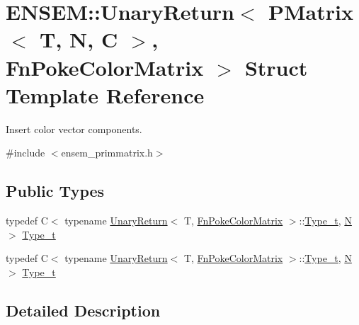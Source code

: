 \hypertarget{structENSEM_1_1UnaryReturn_3_01PMatrix_3_01T_00_01N_00_01C_01_4_00_01FnPokeColorMatrix_01_4}{}\section{E\+N\+S\+EM\+:\+:Unary\+Return$<$ P\+Matrix$<$ T, N, C $>$, Fn\+Poke\+Color\+Matrix $>$ Struct Template Reference}
\label{structENSEM_1_1UnaryReturn_3_01PMatrix_3_01T_00_01N_00_01C_01_4_00_01FnPokeColorMatrix_01_4}


Insert color vector components.  




{\ttfamily \#include $<$ensem\+\_\+primmatrix.\+h$>$}

\subsection*{Public Types}
\begin{DoxyCompactItemize}
\item 
typedef C$<$ typename \mbox{\hyperlink{structENSEM_1_1UnaryReturn}{Unary\+Return}}$<$ T, \mbox{\hyperlink{structENSEM_1_1FnPokeColorMatrix}{Fn\+Poke\+Color\+Matrix}} $>$\+::\mbox{\hyperlink{structENSEM_1_1UnaryReturn_3_01PMatrix_3_01T_00_01N_00_01C_01_4_00_01FnPokeColorMatrix_01_4_a6a760e5a25e755f512b069ab1aee8a4d}{Type\+\_\+t}}, \mbox{\hyperlink{operator__name__util_8cc_a7722c8ecbb62d99aee7ce68b1752f337}{N}} $>$ \mbox{\hyperlink{structENSEM_1_1UnaryReturn_3_01PMatrix_3_01T_00_01N_00_01C_01_4_00_01FnPokeColorMatrix_01_4_a6a760e5a25e755f512b069ab1aee8a4d}{Type\+\_\+t}}
\item 
typedef C$<$ typename \mbox{\hyperlink{structENSEM_1_1UnaryReturn}{Unary\+Return}}$<$ T, \mbox{\hyperlink{structENSEM_1_1FnPokeColorMatrix}{Fn\+Poke\+Color\+Matrix}} $>$\+::\mbox{\hyperlink{structENSEM_1_1UnaryReturn_3_01PMatrix_3_01T_00_01N_00_01C_01_4_00_01FnPokeColorMatrix_01_4_a6a760e5a25e755f512b069ab1aee8a4d}{Type\+\_\+t}}, \mbox{\hyperlink{operator__name__util_8cc_a7722c8ecbb62d99aee7ce68b1752f337}{N}} $>$ \mbox{\hyperlink{structENSEM_1_1UnaryReturn_3_01PMatrix_3_01T_00_01N_00_01C_01_4_00_01FnPokeColorMatrix_01_4_a6a760e5a25e755f512b069ab1aee8a4d}{Type\+\_\+t}}
\end{DoxyCompactItemize}


\subsection{Detailed Description}
